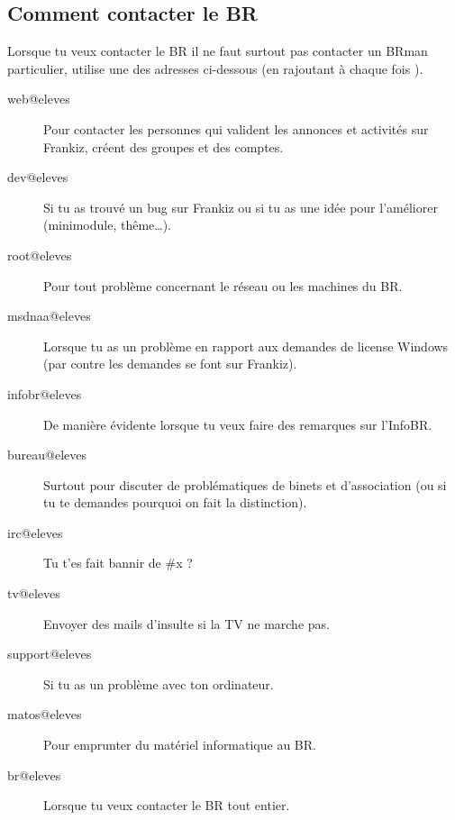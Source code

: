 \subsection{Comment contacter le BR}

Lorsque tu veux contacter le BR il ne faut surtout pas contacter un BRman particulier, utilise une des adresses ci-dessous (en rajoutant à chaque fois ).

\begin{description}

\item[web@eleves] Pour contacter les personnes qui valident les annonces et activités sur Frankiz, créent des groupes et des comptes.

\item[dev@eleves] Si tu as trouvé un bug sur Frankiz ou si tu as une idée pour l'améliorer (minimodule, thême\dots).

\item[root@eleves] Pour tout problème concernant le réseau ou les machines du BR.

\item[msdnaa@eleves] Lorsque tu as un problème en rapport aux demandes de license Windows (par contre les demandes se font sur Frankiz).

\item[infobr@eleves] De manière évidente lorsque tu veux faire des remarques sur l'InfoBR.

\item[bureau@eleves] Surtout pour discuter de problématiques de binets et d'association (ou si tu te demandes pourquoi on fait la distinction). 

\item[irc@eleves] Tu t'es fait bannir de \#x ?

\item[tv@eleves] Envoyer des mails d'insulte si la TV ne marche pas.

\item[support@eleves] Si tu as un problème avec ton ordinateur.

\item[matos@eleves] Pour emprunter du matériel informatique au BR.

\item[br@eleves] Lorsque tu veux contacter le BR tout entier.

\end{description}
